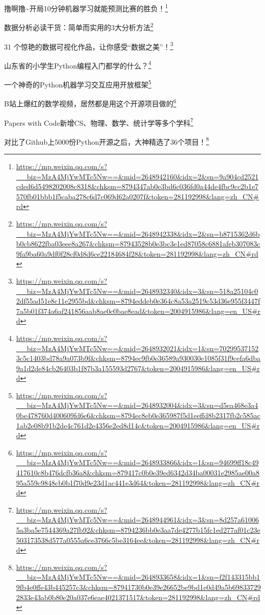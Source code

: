 \documentclass[]{ctexbook}
\renewcommand{\href}[2]{#2\footnote{\url{#1}}}
\begin{document}
\href{https://mp.weixin.qq.com/s?__biz=MzA4MjYwMTc5Nw==\&mid=2648942160\&idx=2\&sn=9a904cd2521cded6d5498202008c8318\&chksm=8794347ab0e3bd6c036fd0a44de4fbc9cc2b1e7570fb01bbb1f5caba278c6d7c069d62a0207f\&token=281192998\&lang=zh_CN\#rd}{撸啊撸\textasciitilde{}开局10分钟机器学习就能预测比赛的胜负！}

\href{https://mp.weixin.qq.com/s?__biz=MzA4MjYwMTc5Nw==\&mid=2648942338\&idx=2\&sn=b8715362d6bb0cb8622fba03eee8a267\&chksm=87943528b0e3bc3e1ed87058c6881afeb307083c9fa9ba60a9df0f28cf0d8d6ce22184684f28\&token=281192998\&lang=zh_CN\#rd}{数据分析必读干货：简单而实用的3大分析方法}

\href{https://mp.weixin.qq.com/s?__biz=MzA4MjYwMTc5Nw==\&mid=2648932340\&idx=3\&sn=518a25104c02df55ad51e8c11e2955bd\&chksm=8794eddeb0e364c8a53a2519c53d36e955f3447f7a5b01f374a6af241856aab8ae0c0bae8ead\&token=2004915986\&lang=en_US\#rd}{31 个惊艳的数据可视化作品，让你感受``数据之美''！}

\href{https://mp.weixin.qq.com/s?__biz=MzA4MjYwMTc5Nw==\&mid=2648932021\&idx=1\&sn=702995371523c5c1403bd78a9a073b9f\&chksm=8794ec9fb0e36589a930030e1085f31f9cefa6dba9a1d2de84cb26403b1f87b3a155593d2767\&token=2004915986\&lang=en_US\#rd}{山东省的小学生Python编程入门都学的什么？}

\href{https://mp.weixin.qq.com/s?__biz=MzA4MjYwMTc5Nw==\&mid=2648932004\&idx=3\&sn=d5ea468e3a40be478760d400609fd6e6\&chksm=8794ec8eb0e365987f5d1eeffd8b2317fb2c585ac1ab2e08b91b2de4c761d2e4356e2ed8d14c\&token=2004915986\&lang=en_US\#rd}{一个神奇的Python机器学习交互应用开放框架}

\href{https://mp.weixin.qq.com/s?__biz=MzA4MjYwMTc5Nw==\&mid=2648933866\&idx=1\&sn=94699ff18c49417610c8b476dcfb36a8\&chksm=879417c0b0e39ed6342d34ba00031e2985ae00a895a559c9848cb0b1f70d9e23d1ac441e3d64\&token=281192998\&lang=zh_CN\#rd}{B站上爆红的数学视频，居然都是用这个开源项目做的}

\href{https://mp.weixin.qq.com/s?__biz=MzA4MjYwMTc5Nw==\&mid=2648944961\&idx=3\&sn=8d257a610065a3ba5e7544369a27fb92\&chksm=8794236bb0e3aa7de4277b15fc1ed277af01c23e503173538d577a0555a6ce3766c5be3164ee\&token=281192998\&lang=zh_CN\#rd}{Papers with Code新增CS、物理、数学、统计学等多个学科}

\href{https://mp.weixin.qq.com/s?__biz=MzA4MjYwMTc5Nw==\&mid=2648933658\&idx=1\&sn=f2f143315bb19fb4e0ffe43b445257c3\&chksm=87941730b0e39e26652be9bd1e0d49a5b698337292833e43ab0b80e20a037e6eae4021371517\&token=281192998\&lang=zh_CN\#rd}{对比了Github上5000份Python开源之后，大神精选了36个项目！}
\end{document}
